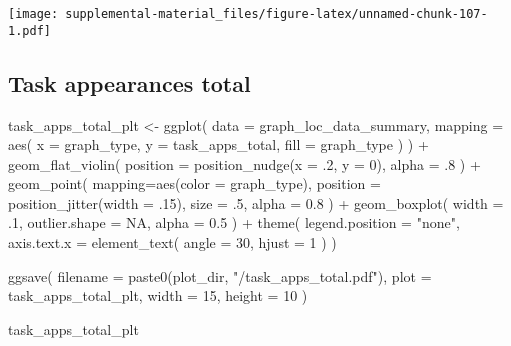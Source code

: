 \documentclass[
]{book}
\newenvironment{Shaded}{\begin{snugshade}}{\end{snugshade}}
\newcommand{\AttributeTok}[1]{\textcolor[rgb]{0.77,0.63,0.00}{#1}}
\newcommand{\ConstantTok}[1]{\textcolor[rgb]{0.00,0.00,0.00}{#1}}
\newcommand{\DecValTok}[1]{\textcolor[rgb]{0.00,0.00,0.81}{#1}}
\newcommand{\FloatTok}[1]{\textcolor[rgb]{0.00,0.00,0.81}{#1}}
\newcommand{\FunctionTok}[1]{\textcolor[rgb]{0.00,0.00,0.00}{#1}}
\newcommand{\NormalTok}[1]{#1}
\newcommand{\OtherTok}[1]{\textcolor[rgb]{0.56,0.35,0.01}{#1}}
\newcommand{\SpecialCharTok}[1]{\textcolor[rgb]{0.00,0.00,0.00}{#1}}
\newcommand{\StringTok}[1]{\textcolor[rgb]{0.31,0.60,0.02}{#1}}
\begin{document}
\texttt{[image: supplemental-material\_files/figure-latex/unnamed-chunk-107-1.pdf]}

\hypertarget{task-appearances-total-1}{%
\subsection{Task appearances total}\label{task-appearances-total-1}}

\begin{Shaded}
\begin{Highlighting}[]
\NormalTok{task\_apps\_total\_plt }\OtherTok{\textless{}{-}} \FunctionTok{ggplot}\NormalTok{(}
    \AttributeTok{data =}\NormalTok{ graph\_loc\_data\_summary,}
    \AttributeTok{mapping =} \FunctionTok{aes}\NormalTok{(}
      \AttributeTok{x =}\NormalTok{ graph\_type,}
      \AttributeTok{y =}\NormalTok{ task\_apps\_total,}
      \AttributeTok{fill =}\NormalTok{ graph\_type}
\NormalTok{    )}
\NormalTok{  ) }\SpecialCharTok{+}
  \FunctionTok{geom\_flat\_violin}\NormalTok{(}
    \AttributeTok{position =} \FunctionTok{position\_nudge}\NormalTok{(}\AttributeTok{x =}\NormalTok{ .}\DecValTok{2}\NormalTok{, }\AttributeTok{y =} \DecValTok{0}\NormalTok{),}
    \AttributeTok{alpha =}\NormalTok{ .}\DecValTok{8}
\NormalTok{  ) }\SpecialCharTok{+}
  \FunctionTok{geom\_point}\NormalTok{(}
    \AttributeTok{mapping=}\FunctionTok{aes}\NormalTok{(}\AttributeTok{color =}\NormalTok{ graph\_type),}
    \AttributeTok{position =} \FunctionTok{position\_jitter}\NormalTok{(}\AttributeTok{width =}\NormalTok{ .}\DecValTok{15}\NormalTok{),}
    \AttributeTok{size =}\NormalTok{ .}\DecValTok{5}\NormalTok{,}
    \AttributeTok{alpha =} \FloatTok{0.8}
\NormalTok{  ) }\SpecialCharTok{+}
  \FunctionTok{geom\_boxplot}\NormalTok{(}
    \AttributeTok{width =}\NormalTok{ .}\DecValTok{1}\NormalTok{,}
    \AttributeTok{outlier.shape =} \ConstantTok{NA}\NormalTok{,}
    \AttributeTok{alpha =} \FloatTok{0.5}
\NormalTok{  ) }\SpecialCharTok{+}
  \FunctionTok{theme}\NormalTok{(}
    \AttributeTok{legend.position =} \StringTok{"none"}\NormalTok{,}
    \AttributeTok{axis.text.x =} \FunctionTok{element\_text}\NormalTok{(}
      \AttributeTok{angle =} \DecValTok{30}\NormalTok{,}
      \AttributeTok{hjust =} \DecValTok{1}
\NormalTok{    )}
\NormalTok{  )}

\FunctionTok{ggsave}\NormalTok{(}
  \AttributeTok{filename =} \FunctionTok{paste0}\NormalTok{(plot\_dir, }\StringTok{"/task\_apps\_total.pdf"}\NormalTok{),}
  \AttributeTok{plot =}\NormalTok{ task\_apps\_total\_plt,}
  \AttributeTok{width =} \DecValTok{15}\NormalTok{,}
  \AttributeTok{height =} \DecValTok{10}
\NormalTok{)}

\NormalTok{task\_apps\_total\_plt}
\end{Highlighting}
\end{Shaded}
\end{document}
